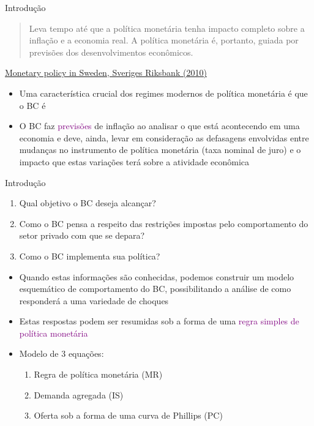 \documentclass[10pt]{beamer}
\begin{document}
\begin{frame}
    {Introdução}
    \begin{quote}
        Leva tempo até que a política monetária tenha impacto completo sobre a inflação e a economia real. A política monetária é, portanto, guiada por previsões dos desenvolvimentos econômicos.
    \end{quote}
    \begin{flushright}
        \href{https://archive.riksbank.se/Upload/Dokument_riksbank/Kat_publicerat/Rapporter/2010/Monetary_policy_2010.pdf}{Monetary policy in Sweden, Sveriges Riksbank (2010)}
    \end{flushright}
    \begin{itemize}
        \item Uma característica crucial dos regimes modernos de política monetária é que o BC é \bigskip
        \item O BC faz \textcolor{purple}{previsões} de inflação ao analisar o que está acontecendo em uma economia e deve, ainda, levar em consideração as defasagens envolvidas entre mudanças no instrumento de política monetária (taxa nominal de juro) e o impacto que estas variações terá sobre a atividade econômica
    \end{itemize}
\end{frame}

\begin{frame}
    {Introdução}
    \begin{enumerate}
        \item Qual objetivo o BC deseja alcançar?\medskip
        \item Como o BC pensa a respeito das restrições impostas pelo comportamento do setor privado com que se depara?\medskip
        \item Como o BC implementa sua política?\medskip
    \end{enumerate}
    \begin{itemize}
        \item Quando estas informações são conhecidas, podemos construir um modelo esquemático de comportamento do BC, possibilitando a análise de como responderá a uma variedade de choques\bigskip
        \item Estas respostas podem ser resumidas sob a forma de uma \textcolor{purple}{regra simples de política monetária}\bigskip
        \item Modelo de 3 equações:
        \begin{enumerate}
            \item Regra de política monetária (MR)\medskip
            \item Demanda agregada (IS)\medskip
            \item Oferta sob a forma de uma curva de Phillips (PC)
        \end{enumerate}
    \end{itemize}
\end{frame}
\end{document}
